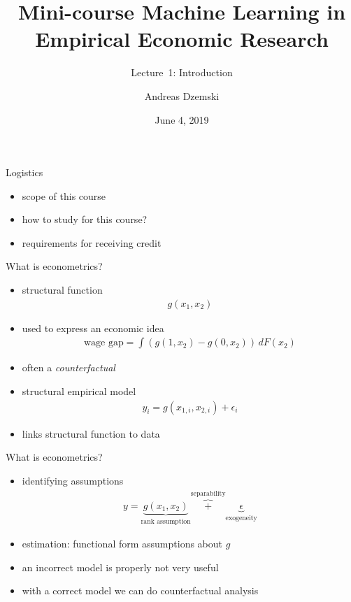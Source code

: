 \documentclass[xcolor=dvipsnames]{beamer}
\author[Dzemski]{Andreas Dzemski\inst{1}}
\institute{\inst{1} University of Gothenburg}
\title{Mini-course Machine Learning in Empirical Economic Research}
\date{June 4, 2019}
\subtitle{Lecture~1: Introduction}
\begin{document}
\maketitle

\begin{frame}{Logistics}
\begin{itemize}
\item scope of this course
\item how to study for this course?
\item requirements for receiving credit
\end{itemize}
\end{frame}

\begin{frame}{What is econometrics?}
\pause
\begin{itemize}
  \item structural function
  \begin{align*}
    g(x_1, x_2)
  \end{align*}
  \item used to express an economic idea
  \begin{align*}
    \text{wage gap} = \int \left(g(1, x_2) - g(0, x_2)\right) \, dF(x_2)
  \end{align*}
  \item often a \emph{counterfactual}
  \pause
  \item structural empirical model
  \begin{align*}
    y_i = g(x_{1,i}, x_{2,i}) + \epsilon_i
  \end{align*}
  \item links structural function to data
\end{itemize}
\end{frame}

\begin{frame}{What is econometrics?}
  \begin{itemize}
    \item identifying assumptions
      \begin{align*}
        y = \underbrace{g(x_1, x_2)}_{\text{rank assumption}} \overbrace{+}^{\text{separability}} \underbrace{\epsilon}_{\text{exogeneity}}
      \end{align*}
    \item estimation: functional form assumptions about $g$
    \item an incorrect model is properly not very useful
    \item with a correct model we can do counterfactual analysis
  \end{itemize}
\end{frame}
\end{document}
